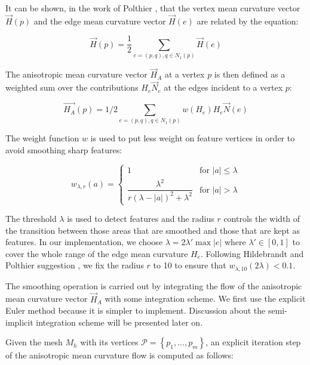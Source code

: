 \documentclass[11pt]{article}
\begin{document}
It can be shown, in the work of Polthier \cite{PolthierHabilitation}, that the vertex mean curvature vector $\vec{H}(p)$ and the edge mean curvature vector $\vec{H}(e)$ are related by the equation:

\begin{equation}
\vec{H}(p) = \frac{1}{2}\sum\limits_{e = (p, q), q \in N_1(p)}\vec{H}(e)
\end{equation}

The anisotropic mean curvature vector $\vec{H}_A$ at a vertex $p$ is then defined as a weighted sum over the contributions $H_e\vec{N}_e$ at the edges incident to a vertex $p$:

\begin{equation}
\vec{H_A}(p) = 1/2\sum\limits_{e = (p, q), q \in N_1(p)}{w(H_e)H_e \vec{N}(e)}
\label{eq:aniso}
\end{equation}

The weight function $w$ is used to put less weight on feature vertices in order to avoid smoothing sharp features:

\begin{equation}
w_{\lambda, r}(a) = 
\begin{cases}
1 & \text{for } |a| \leq \lambda \\
\dfrac{\lambda^2}{r(\lambda - |a|)^2+\lambda^2} & \text{for } |a| > \lambda
\end{cases}
\end{equation}

The threshold $\lambda$ is used to detect features and the radius $r$ controls the width of the transition between those areas that are smoothed and those that are kept as features. In our implementation, we choose $\lambda = 2 \lambda' \max |e| $ where $\lambda' \in \left[ 0, 1 \right] $ to cover the whole range of the edge mean curvature $H_e$. Following Hildebrandt and Polthier suggestion \cite{Hildebrandt04anisotropicfiltering}, we fix the radius $r$ to 10 to ensure that $w_{\lambda, 10}(2\lambda) < 0.1$.

The smoothing operation is carried out by integrating the flow of the anisotropic mean curvature vector $\vec{H}_A$ with some integration scheme. We first use the explicit Euler method because it is simpler to implement. Discussion about the semi-implicit integration scheme will be presented later on.

Given the mesh $M_h$ with its vertices $\mathcal{P} = \left\lbrace p_1, ..., p_m \right\rbrace $, an explicit iteration step of the anisotropic mean curvature flow is computed as follows:
\end{document}
